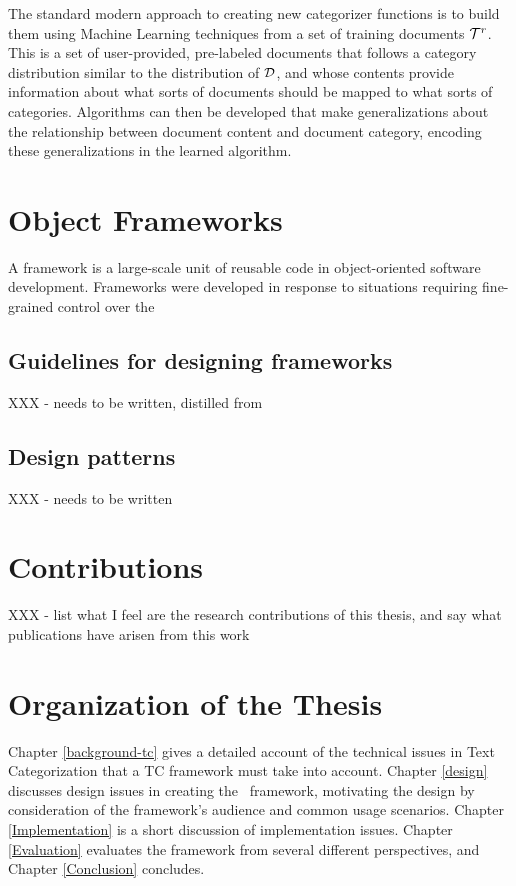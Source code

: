 The standard modern approach to creating new categorizer functions is
to build them using Machine Learning techniques from a set of training
documents $\mathcal{T}^r$.  This is a set of user-provided, pre-labeled documents that
follows a category
distribution similar to the distribution of $\mathcal{D}$, and whose contents
provide information about what sorts of documents should be mapped to
what sorts of categories.  Algorithms can then be developed that make
generalizations about the relationship between document content and
document category, encoding these generalizations in the learned algorithm.

\section{Object Frameworks}

A framework is a large-scale unit of reusable code in object-oriented
software development.  Frameworks were developed in response to
situations requiring fine-grained control over the

\subsection{Guidelines for designing frameworks}

XXX - needs to be written, distilled from \cite{fayad:99}

\subsection{Design patterns}

XXX - needs to be written

\section{Contributions}

XXX - list what I feel are the research contributions of this thesis,
and say what publications have arisen from this work

\section{Organization of the Thesis}

Chapter \ref{background-tc} gives a detailed account of the technical
issues in Text Categorization that a TC framework must take into
account.  Chapter \ref{design} discusses design issues in creating the
\aicat\ framework, motivating the design by consideration of the
framework's audience and common usage scenarios.  Chapter
\ref{Implementation} is a short discussion of implementation issues.
Chapter \ref{Evaluation} evaluates the framework from several
different perspectives, and Chapter \ref{Conclusion} concludes.
